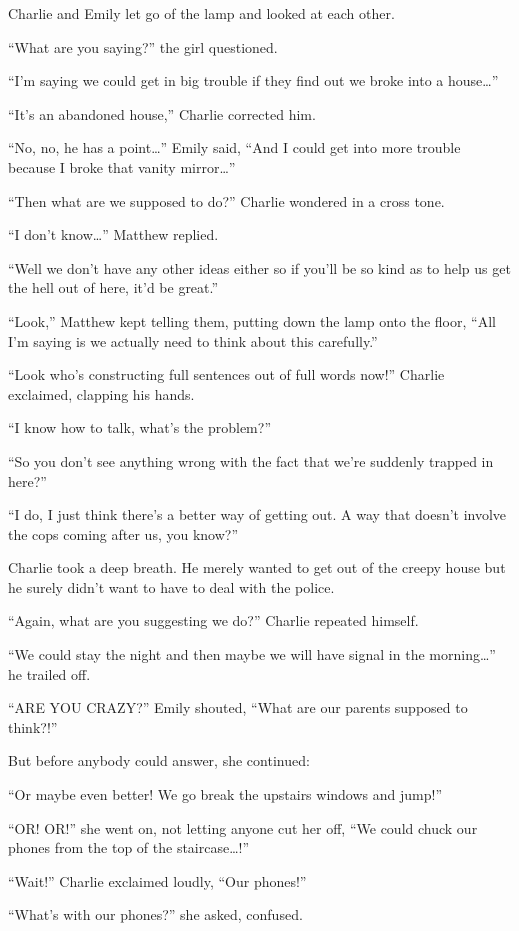 Charlie and Emily let go of the lamp and looked at each other.

“What are you saying?” the girl questioned.

“I'm saying we could get in big trouble if they find out we broke into a house…”

“It's an abandoned house,” Charlie corrected him.

“No, no, he has a point…” Emily said, “And I could get into more trouble because I broke that vanity mirror…”

“Then what are we supposed to do?” Charlie wondered in a cross tone.

“I don't know…” Matthew replied.

“Well we don't have any other ideas either so if you'll be so kind as to help us get the hell out of here, it'd be great.”

“Look,” Matthew kept telling them, putting down the lamp onto the floor, “All I'm saying is we actually need to think about this carefully.”

“Look who's constructing full sentences out of full words now!” Charlie exclaimed, clapping his hands.

“I know how to talk, what's the problem?”

“So you don't see anything wrong with the fact that we're suddenly trapped in here?”

“I do, I just think there's a better way of getting out. A way that doesn't involve the cops coming after us, you know?”

Charlie took a deep breath. He merely wanted to get out of the creepy house but he surely didn't want to have to deal with the police.

“Again, what are you suggesting we do?” Charlie repeated himself.

“We could stay the night and then maybe we will have signal in the morning…” he trailed off.

“ARE YOU CRAZY?” Emily shouted, “What are our parents supposed to think?!”

But before anybody could answer, she continued:

“Or maybe even better! We go break the upstairs windows and jump!”

“OR! OR!” she went on, not letting anyone cut her off, “We could chuck our phones from the top of the staircase…!”

“Wait!” Charlie exclaimed loudly, “Our phones!”

“What's with our phones?” she asked, confused.

